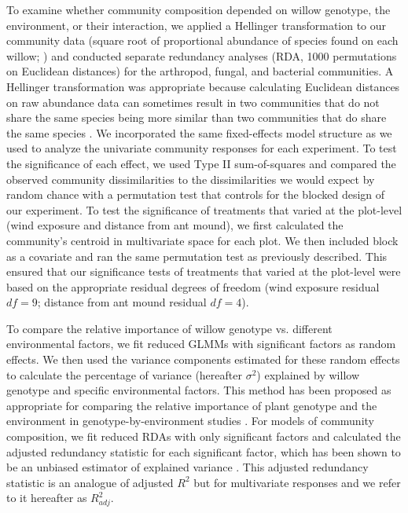 \documentclass[11pt]{article}
\begin{document}
To examine whether community composition depended on willow genotype,
the environment, or their interaction, we applied a Hellinger
transformation to our community data (square root of proportional
abundance of species found on each willow; \citealt{Legendre_2001}) and
conducted separate redundancy analyses (RDA, 1000 permutations on
Euclidean distances) for the arthropod, fungal, and bacterial
communities. A Hellinger transformation was appropriate because
calculating Euclidean distances on raw abundance data can sometimes
result in two communities that do not share the same species being more
similar than two communities that do share the same species
\cite{Legendre_2001}. We incorporated the same fixed-effects model structure
as we used to analyze the univariate community responses for each
experiment. To test the significance of each effect, we used Type II
sum-of-squares and compared the observed community dissimilarities to
the dissimilarities we would expect by random chance with a permutation
test that controls for the blocked design of our experiment. To test the
significance of treatments that varied at the plot-level (wind exposure
and distance from ant mound), we first calculated the community's
centroid in multivariate space for each plot. We then included block as
a covariate and ran the same permutation test as previously described.
This ensured that our significance tests of treatments that varied at
the plot-level were based on the appropriate residual degrees of freedom
(wind exposure residual \(df=9\); distance from ant mound
residual \(df=4\)).

To compare the relative importance of willow genotype vs. different
environmental factors, we fit reduced GLMMs with significant factors as
random effects. We then used the variance components estimated for these
random effects to calculate the percentage of variance (hereafter
\(\sigma^2\)) explained by willow genotype and specific
environmental factors. This method has been proposed as appropriate for
comparing the relative importance of plant genotype and the environment
in genotype-by-environment studies \cite{Johnson_2005}\cite{Hersch_Green_2011}. For
models of community composition, we fit reduced RDAs with only
significant factors and calculated the adjusted redundancy statistic for
each significant factor, which has been shown to be an unbiased
estimator of explained variance \cite{Peres_Neto_2006}. This adjusted
redundancy statistic is an analogue of adjusted \(R^2\) but for
multivariate responses and we refer to it hereafter as \(R^2_{adj}\).
\end{document}
